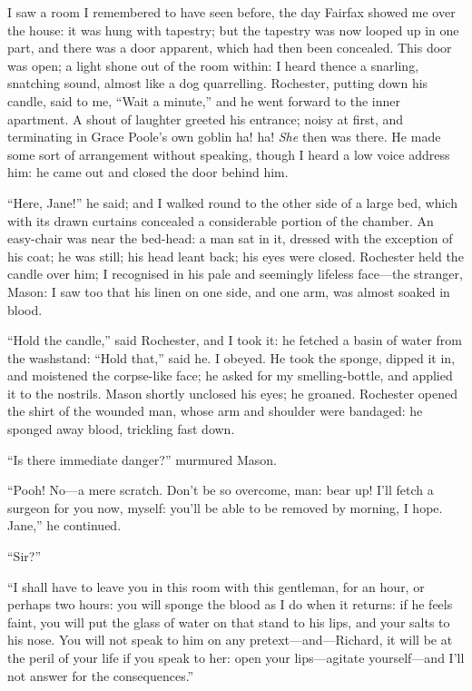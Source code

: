 I saw a room I remembered to have seen before, the day \Mrs{} Fairfax
showed me over the house: it was hung with tapestry; but the tapestry
was now looped up in one part, and there was a door apparent, which had
then been concealed. This door was open; a light shone out of the room
within: I heard thence a snarling, snatching sound, almost like a dog
quarrelling. \Mr{} Rochester, putting down his candle, said to me,
\enquote{Wait a minute,} and he went forward to the inner apartment. A
shout of laughter greeted his entrance; noisy at first, and terminating
in Grace Poole's own goblin ha! ha! \emph{She} then was there. He made
some sort of arrangement without speaking, though I heard a low voice
address him: he came out and closed the door behind him.

\enquote{Here, Jane!} he said; and I walked round to the other side of a
large bed, which with its drawn curtains concealed a considerable
portion of the chamber. An easy-chair was near the bed-head: a man sat
in it, dressed with the exception of his coat; he was still; his head
leant back; his eyes were closed. \Mr{} Rochester held the candle over
him; I recognised in his pale and seemingly lifeless face---the
stranger, Mason: I saw too that his linen on one side, and one arm, was
almost soaked in blood.

\enquote{Hold the candle,} said \Mr{} Rochester, and I took it: he fetched
a basin of water from the washstand: \enquote{Hold that,} said he. I
obeyed. He took the sponge, dipped it in, and moistened the corpse-like
face; he asked for my smelling-bottle, and applied it to the nostrils. 
\Mr{} Mason shortly unclosed his eyes; he groaned. \Mr{} Rochester opened
the shirt of the wounded man, whose arm and shoulder were bandaged: he
sponged away blood, trickling fast down.

\enquote{Is there immediate danger?} murmured \Mr{} Mason.

\enquote{Pooh! No---a mere scratch. Don't be so overcome, man: bear
up! I'll fetch a surgeon for you now, myself: you'll be able to be
removed by morning, I hope. Jane,} he continued.

\enquote{Sir?}

\enquote{I shall have to leave you in this room with this gentleman, for
an hour, or perhaps two hours: you will sponge the blood as I do when it
returns: if he feels faint, you will put the glass of water on that
stand to his lips, and your salts to his nose. You will not speak to
him on any pretext---and---Richard, it will be at the peril of your life
if you speak to her: open your lips---agitate yourself---and I'll not
answer for the consequences.}

